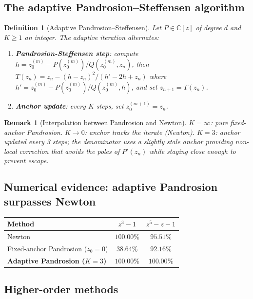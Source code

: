 \documentclass[11pt,a4paper]{article}
\newtheorem{remark}[theorem]{Remark}
\newtheorem{definition}[theorem]{Definition}
\begin{document}
\subsection{The adaptive Pandrosion--Steffensen algorithm}

\begin{definition}[Adaptive Pandrosion--Steffensen]
Let $P \in \mathbb{C}[z]$ of degree $d$ and $K \ge 1$ an integer. The adaptive iteration alternates:
\begin{enumerate}
\item \textbf{Pandrosion-Steffensen step}: compute $h = z_0^{(m)} - P(z_0^{(m)})/Q(z_0^{(m)}, z_n)$, then $T(z_n) = z_n - (h - z_n)^2/(h' - 2h + z_n)$ where $h' = z_0^{(m)} - P(z_0^{(m)})/Q(z_0^{(m)}, h)$, and set $z_{n+1} = T(z_n)$.
\item \textbf{Anchor update}: every $K$ steps, set $z_0^{(m+1)} = z_n$.
\end{enumerate}
\end{definition}

\begin{remark}[Interpolation between Pandrosion and Newton]
$K = \infty$: pure fixed-anchor Pandrosion. $K \to 0$: anchor tracks the iterate (Newton). $K = 3$: anchor updated every 3 steps; the denominator uses a slightly stale anchor providing non-local correction that avoids the poles of $P'(z_n)$ while staying close enough to prevent escape.
\end{remark}

\subsection{Numerical evidence: adaptive Pandrosion surpasses Newton}

\begin{center}
\begin{tabular}{lcc}
\toprule
\textbf{Method} & $z^3 - 1$ & $z^5 - z - 1$ \\
\midrule
Newton                              & $100.00\%$ & $95.51\%$ \\
Fixed-anchor Pandrosion ($z_0 = 0$) & $38.64\%$  & $92.16\%$ \\
\textbf{Adaptive Pandrosion ($K = 3$)} & $\mathbf{100.00\%}$ & $\mathbf{100.00\%}$ \\
\bottomrule
\end{tabular}
\end{center}

\subsection{Higher-order methods}
\end{document}
